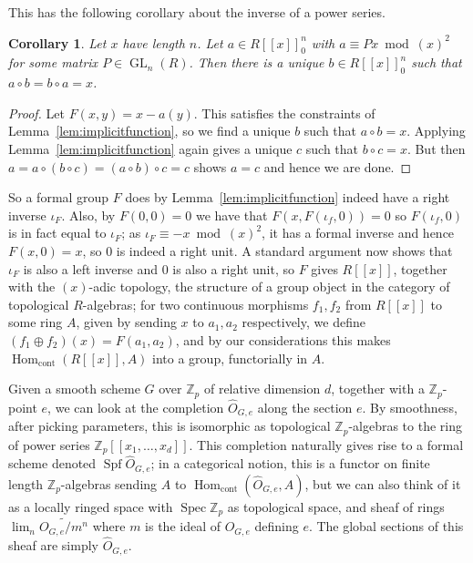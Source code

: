 \documentclass[12pt]{article}
\newcommand{\Z}{\mathbb{Z}}
\DeclareMathOperator{\Hom}{Hom}
\DeclareMathOperator{\Spec}{Spec}
\DeclareMathOperator{\Spf}{Spf}
\DeclareMathOperator{\GL}{GL}
\theoremstyle{plain}
\newtheorem{cor}[thm]{Corollary} %
\theoremstyle{definition}
\theoremstyle{remark}
\begin{document}
This has the following corollary about the inverse of a power series.
\begin{cor}
\label{lem:formalinverse}
Let $x$ have length $n$. Let $a \in R[[x]]_0^n$ with $a \equiv Px \bmod (x)^2$ for some matrix $P\in \GL_n(R)$. Then there is a unique $b \in R[[x]]_0^n$ such that $a \circ b = b \circ a = x$.
\end{cor}
\begin{proof}
Let $F(x,y) = x - a(y)$. This satisfies the constraints of Lemma~\ref{lem:implicitfunction}, so we find a unique $b$ such that $a \circ b = x$. Applying Lemma~\ref{lem:implicitfunction} again gives a unique $c$ such that $b \circ c = x$. But then $a = a \circ (b \circ c) = (a \circ b) \circ c = c$ shows $a = c$ and hence we are done.
\end{proof}
So a formal group $F$ does by Lemma~\ref{lem:implicitfunction} indeed have a right inverse $\iota_F$. Also, by $F(0,0) = 0$ we have that $F(x,F(\iota_f,0)) = 0$ so $F(\iota_f,0)$ is in fact equal to $\iota_F$; as $\iota_F \equiv -x \bmod (x)^2$, it has a formal inverse and hence $F(x,0) = x$, so $0$ is indeed a right unit. A standard argument now shows that $\iota_F$ is also a left inverse and $0$ is also a right unit, so $F$ gives $R[[x]]$, together with the $(x)$-adic topology, the structure of a group object in the category of topological $R$-algebras; for two continuous morphisms $f_1,f_2$ from $R[[x]]$ to some ring $A$, given by sending $x$ to $a_1,a_2$ respectively, we define $(f_1 \oplus f_2)(x) = F(a_1,a_2)$, and by our considerations this makes $\Hom_{\text{cont}}(R[[x]],A)$ into a group, functorially in $A$.

Given a smooth scheme $G$ over $\Z_p$ of relative dimension $d$, together with a $\Z_p$-point $e$, we can look at the completion $\widehat{O}_{G,e}$ along the section $e$. By smoothness, after picking parameters, this is isomorphic as topological $\Z_p$-algebras to the ring of power series $\Z_p[[x_1,\dots,x_d]]$. This completion naturally gives rise to a formal scheme denoted $\Spf \widehat{O}_{G,e}$; in a categorical notion, this is a functor on finite length $\Z_p$-algebras sending $A$ to $\Hom_{\text{cont}}(\widehat{O}_{G,e},A)$, but we can also think of it as a locally ringed space with $\Spec \Z_p$ as topological space, and sheaf of rings $\lim_n \widetilde{O_{G,e}/m^n}$ where $m$ is the ideal of $O_{G,e}$ defining $e$. The global sections of this sheaf are simply $\widehat{O}_{G,e}$. 
\end{document}
